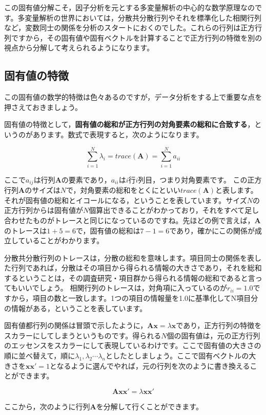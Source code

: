\documentclass{ltjsbook}
\begin{document}
この固有値分解こそ，因子分析を元とする多変量解析の中心的な数学原理なのです。多変量解析の世界においては，分散共分散行列やそれを標準化した相関行列など，変数同士の関係を分析のスタートにおくのでした。これらの行列は正方行列ですから，その固有値や固有ベクトルを計算することで正方行列の特徴を別の視点から分解して考えられるようになります。

\subsection{固有値の特徴}
この固有値の数学的特徴は色々あるのですが，データ分析をする上で重要な点を押さえておきましょう。

固有値の特徴として，\textbf{固有値の総和が正方行列の対角要素の総和に合致する}，というのがあります。数式で表現すると，次のようになります。

\[ \sum_{i=1}^N \lambda_i = trace(\bm{A}) = \sum_{i=1}^N a_{ii} \]

ここで$a_{ij}$は行列$\bm{A}$の要素であり，$a_{ii}$は$i$行$i$列目，つまり対角要素です。
この正方行列$\bm{A}$のサイズは$N$で，対角要素の総和をとくにといい$trace(\bm{A})$と表します。
それが固有値の総和とイコールになる，ということを表しています。サイズ$N$の正方行列からは固有値が$N$個算出できることがわかっており，それをすべて足し合わせたものがトレースと同じになっているのですね。先ほどの例で言えば，$\bm{A}$のトレースは$1+5=6$で，固有値の総和は$7-1=6$であり，確かにこの関係が成立していることがわかります。

分散共分散行列のトレースは，分散の総和を意味します。項目同士の関係を表した行列であれば，分散はその項目から得られる情報の大きさであり，それを総和するということは，その調査研究・項目群から得られる情報の総和であると言ってもいいでしょう。
相関行列のトレースは，対角項に入っているのが$r_{ii}=1.0$ですから，項目の数と一致します。1つの項目の情報量を1.0に基準化してN項目分の情報がある，ということを表しています。

固有値都行列の関係は冒頭で示したように，$\bm{Ax}=\lambda \bm{x}$であり，正方行列の特徴をスカラーにしてしまうというものです。得られる$N$個の固有値は，元の正方行列のエッセンスをスカラーにして表現しているわけです。ここで固有値の大きさの順に並べ替えて，順に$\lambda_1,\lambda_2 \cdots \lambda_n$としたとしましょう。ここで固有ベクトルの大きさを$\bm{xx'}=1$となるように選んでやれば，元の行列を次のように書き換えることができます。

\[
    \bm{Axx'} = \lambda \bm{xx'}
\]

ここから，次のように行列$\bm{A}$を分解して行くことができます。
\end{document}
